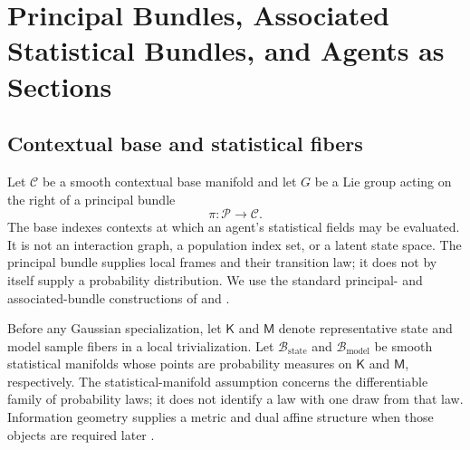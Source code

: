 \chapter{Principal Bundles, Associated Statistical Bundles, and Agents as Sections}
\label{ch:bundle-geometry}

\section{Contextual base and statistical fibers}

Let \(\mathcal C\) be a smooth contextual base manifold and let \(G\) be a Lie group acting on the right of a principal bundle
\begin{equation}
\pi:\mathcal P\longrightarrow\mathcal C.
\label{eq:principal-bundle}
\end{equation}
The base indexes contexts at which an agent's statistical fields may be evaluated. It is not an interaction graph, a population index set, or a latent state space. The principal bundle supplies local frames and their transition law; it does not by itself supply a probability distribution. We use the standard principal- and associated-bundle constructions of \citet{Kobayashi1963} and \citet{Nakahara2003}.

Before any Gaussian specialization, let \(\mathsf K\) and \(\mathsf M\) denote representative state and model sample fibers in a local trivialization. Let \(\mathcal B_{\mathrm{state}}\) and \(\mathcal B_{\mathrm{model}}\) be smooth statistical manifolds whose points are probability measures on \(\mathsf K\) and \(\mathsf M\), respectively. The statistical-manifold assumption concerns the differentiable family of probability laws; it does not identify a law with one draw from that law. Information geometry supplies a metric and dual affine structure when those objects are required later \citep{Amari2016,AmariNagaoka2000}.

